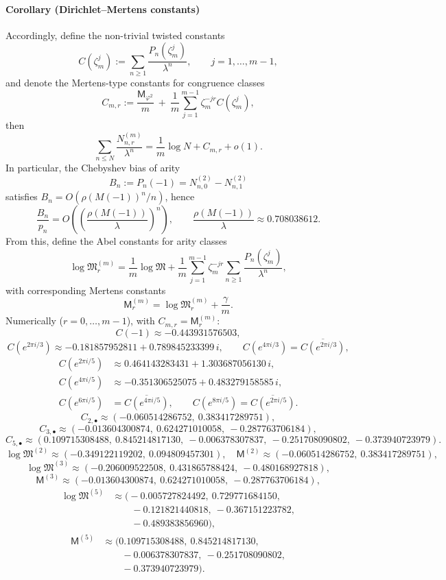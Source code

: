\paragraph{Corollary (Dirichlet--Mertens constants)}
Accordingly, define the non-trivial twisted constants
\[
C(\zeta_m^j):=\sum_{n\ge 1}\frac{P_n(\zeta_m^j)}{\lambda^n},
\qquad j=1,\dots,m-1,
\]
and denote the Mertens-type constants for congruence classes
\[
C_{m,r}:=\frac{\mathsf{M}_{\varphi^2}}{m}
\ +\ \frac{1}{m}\sum_{j=1}^{m-1}\zeta_m^{-jr}C(\zeta_m^j),
\]
then
\[
\sum_{n\le N}\frac{N_{n,r}^{(m)}}{\lambda^n}
=\frac{1}{m}\log N+C_{m,r}+o(1).
\]
In particular, the Chebyshev bias of arity
\[
B_n:=P_n(-1)=N_{n,0}^{(2)}-N_{n,1}^{(2)}
\]
satisfies $B_n=O(\rho(M(-1))^n/n)$, hence
\[
\frac{B_n}{p_n}=O\!\left(\left(\frac{\rho(M(-1))}{\lambda}\right)^n\right),
\qquad
\frac{\rho(M(-1))}{\lambda}\approx 0.708038612.
\]
From this, define the Abel constants for arity classes
\[
\log\mathfrak{M}_r^{(m)}
=\frac{1}{m}\log\mathfrak{M}
+\frac{1}{m}\sum_{j=1}^{m-1}\zeta_m^{-jr}\sum_{n\ge 1}\frac{P_n(\zeta_m^j)}{\lambda^n},
\]
with corresponding Mertens constants
\[
\mathsf{M}_r^{(m)}=\log\mathfrak{M}_r^{(m)}+\frac{\gamma}{m}.
\]
Numerically ($r=0,\dots,m-1$), with $C_{m,r}=\mathsf{M}_r^{(m)}$:
\[
C(-1)\approx -0.443931576503,
\]
\[
C(e^{2\pi i/3})\approx -0.181857952811+0.789845233399\,i,
\qquad
C(e^{4\pi i/3})=\overline{C(e^{2\pi i/3})},
\]
\[
\begin{aligned}
C(e^{2\pi i/5})&\approx 0.464143283431+1.303687056130\,i,\\
C(e^{4\pi i/5})&\approx -0.351306525075+0.483279158585\,i,\\
C(e^{6\pi i/5})&=\overline{C(e^{4\pi i/5})},\qquad
C(e^{8\pi i/5})=\overline{C(e^{2\pi i/5})}.
\end{aligned}
\]
\[
C_{2,\bullet}\approx(-0.060514286752,\ 0.383417289751),
\]
\[
C_{3,\bullet}\approx(-0.013604300874,\ 0.624271010058,\ -0.287763706184),
\]
\[
C_{5,\bullet}\approx(0.109715308488,\ 0.845214817130,\ -0.006378307837,\ -0.251708090802,\ -0.373940723979).
\]
\[
\log\mathfrak{M}^{(2)}\approx(-0.349122119202,\ 0.094809457301),
\quad
\mathsf{M}^{(2)}\approx(-0.060514286752,\ 0.383417289751),
\]
\[
\log\mathfrak{M}^{(3)}\approx(-0.206009522508,\ 0.431865788424,\ -0.480168927818),
\]
\[
\mathsf{M}^{(3)}\approx(-0.013604300874,\ 0.624271010058,\ -0.287763706184),
\]
\[
\begin{aligned}
\log\mathfrak{M}^{(5)}&\approx\bigl(-0.005727824492,\ 0.729771684150,\\
&\qquad -0.121821440818,\ -0.367151223782,\\
&\qquad -0.489383856960\bigr),
\end{aligned}
\]
\[
\begin{aligned}
\mathsf{M}^{(5)}&\approx\bigl(0.109715308488,\ 0.845214817130,\\
&\qquad -0.006378307837,\ -0.251708090802,\\
&\qquad -0.373940723979\bigr).
\end{aligned}
\]
